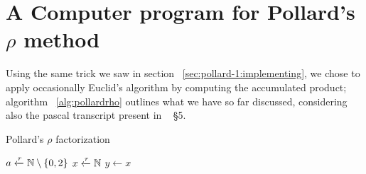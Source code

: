 \section{A Computer program for Pollard's $\rho$ method}

Using the same trick we saw in section ~\ref{sec:pollard-1:implementing},  we
chose to apply occasionally Euclid's algorithm by computing the accumulated
product; algorithm ~\ref{alg:pollardrho} outlines what we have so far discussed,
considering also the pascal transcript present in ~\cite{riesel} \S 5.

\begin{algorithm}
  \caption{Pollard's $\rho$ factorization \label{alg:pollardrho}}
  \begin{algorithmic}[1]
    \State $a \xleftarrow{r} \mathbb{N} \setminus \{0, 2\}$
    \State $x \xleftarrow{r} \mathbb{N}$
    \State $y \gets x$
  \end{algorithmic}
\end{algorithm}
